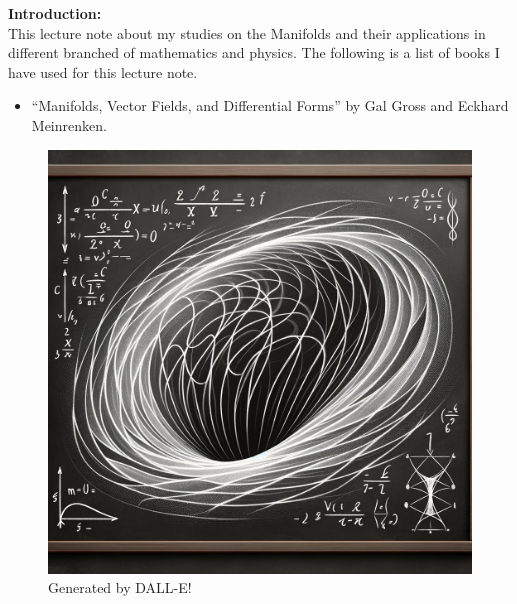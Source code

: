 \documentclass[10pt]{book}
\begin{document}





\begin{center}
\textbf{Introduction:}\\
This lecture note about my studies on the Manifolds and their applications in different branched of mathematics and physics. The following is a list of books I have used for this lecture note.
\begin{itemize}
	\item ``Manifolds, Vector Fields, and Differential Forms'' by Gal Gross and Eckhard Meinrenken.
\end{itemize}
\end{center}
\begin{figure}[h!]
	\centering
	\includegraphics[width=0.7\linewidth]{Images/DifferentialGeometry}
	\caption*{Generated by DALL-E!}
	\label{fig:differentialgeometry}
\end{figure}


\tableofcontents



\newpage


\end{document}
